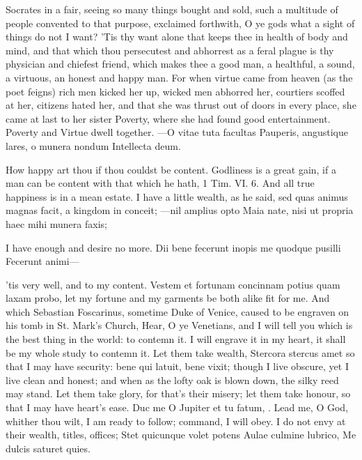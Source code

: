 {Socrates in a fair, seeing so many things bought and sold, such a
multitude of people convented to that purpose, exclaimed forthwith, O
ye gods what a sight of things do not I want? 'Tis thy want alone that
keeps thee in health of body and mind, and that which thou persecutest
and abhorrest as a feral plague is thy physician and chiefest
friend, which makes thee a good man, a healthful, a sound, a virtuous,
an honest and happy man. For when virtue came from heaven (as the poet
feigns) rich men kicked her up, wicked men abhorred her, courtiers
scoffed at her, citizens hated her, and that she was thrust out
of doors in every place, she came at last to her sister Poverty, where
she had found good entertainment. Poverty and Virtue dwell together.
---O vitae tuta facultas
Pauperis, angustique lares, o munera nondum
Intellecta deum.

How happy art thou if thou couldst be content. Godliness is a great
gain, if a man can be content with that which he hath, 1 Tim. VI. 6.
And all true happiness is in a mean estate. I have a little wealth, as
he said, sed quas animus magnas facit, a kingdom in conceit;
---nil amplius opto
Maia nate, nisi ut propria haec mihi munera faxis;

I have enough and desire no more.
Dii bene fecerunt inopis me quodque pusilli
Fecerunt animi---

'tis very well, and to my content. Vestem et fortunam concinnam
potius quam laxam probo, let my fortune and my garments be both alike
fit for me. And which Sebastian Foscarinus, sometime Duke of
Venice, caused to be engraven on his tomb in St. Mark's Church, Hear, O
ye Venetians, and I will tell you which is the best thing in the world:
to contemn it. I will engrave it in my heart, it shall be my whole
study to contemn it. Let them take wealth, Stercora stercus amet so
that I may have security: bene qui latuit, bene vixit; though I live
obscure,  yet I live clean and honest; and when as the lofty oak
is blown down, the silky reed may stand. Let them take glory, for
that's their misery; let them take honour, so that I may have heart's
ease. Duc me O Jupiter et tu fatum, \etc{}. Lead me, O God, whither
thou wilt, I am ready to follow; command, I will obey. I do not envy at
their wealth, titles, offices;
Stet quicunque volet potens
Aulae culmine lubrico,
Me dulcis saturet quies.

}
